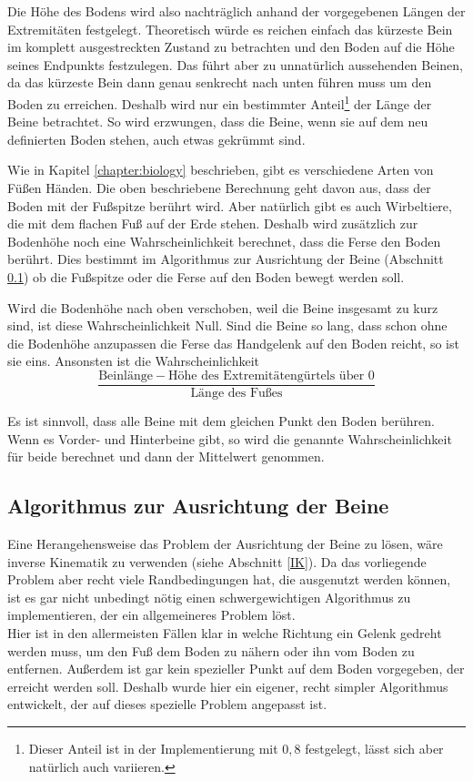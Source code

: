 Die Höhe des Bodens wird also nachträglich anhand der vorgegebenen Längen der Extremitäten festgelegt.
Theoretisch würde es reichen einfach das kürzeste Bein im komplett ausgestreckten Zustand zu betrachten und den Boden auf die Höhe seines Endpunkts festzulegen.
Das führt aber zu unnatürlich aussehenden Beinen, da das kürzeste Bein dann genau senkrecht nach unten führen muss um den Boden zu erreichen.
Deshalb wird nur ein bestimmter Anteil\footnote{Dieser Anteil ist in der Implementierung mit $0{,}8$ festgelegt, lässt sich aber natürlich auch variieren.} der Länge der Beine betrachtet. So wird erzwungen, dass die Beine, wenn sie auf dem neu definierten Boden stehen, auch etwas gekrümmt sind.

Wie in Kapitel \ref{chapter:biology} beschrieben, gibt es verschiedene Arten von Füßen \bzw Händen. Die oben beschriebene Berechnung geht davon aus, dass der Boden mit der Fußspitze berührt wird. Aber natürlich gibt es auch Wirbeltiere, die mit dem flachen Fuß auf der Erde stehen.
Deshalb wird zusätzlich zur Bodenhöhe noch eine Wahrscheinlichkeit berechnet, dass die Ferse den Boden berührt. Dies bestimmt im Algorithmus zur Ausrichtung der Beine (Abschnitt \ref{leg_algo}) ob die Fußspitze oder die Ferse auf den Boden bewegt werden soll.

Wird die Bodenhöhe nach oben verschoben, weil die Beine insgesamt zu kurz sind, ist diese Wahrscheinlichkeit Null.
Sind die Beine so lang, dass schon ohne die Bodenhöhe anzupassen die Ferse \bzw das Handgelenk auf den Boden reicht, so ist sie eins.
Ansonsten ist die Wahrscheinlichkeit 
\[\frac{\text{Beinlänge} - \text{Höhe des Extremitätengürtels über }0}{\text{Länge des Fußes}}\]

Es ist sinnvoll, dass alle Beine mit dem gleichen Punkt den Boden berühren.
Wenn es Vorder- und Hinterbeine gibt, so wird die genannte Wahrscheinlichkeit für beide berechnet und dann der Mittelwert genommen. 


\subsection{Algorithmus zur Ausrichtung der Beine}
\label{leg_algo}

Eine Herangehensweise das Problem der Ausrichtung der Beine zu lösen, wäre inverse Kinematik zu verwenden (siehe Abschnitt \ref{IK}). 
Da das vorliegende Problem aber recht viele Randbedingungen hat, die ausgenutzt werden können, ist es gar nicht unbedingt nötig einen schwergewichtigen Algorithmus zu implementieren, der ein allgemeineres Problem löst.\\
Hier ist \zb in den allermeisten Fällen klar in welche Richtung ein Gelenk gedreht werden muss, um den Fuß dem Boden zu nähern oder ihn vom Boden zu entfernen. Außerdem ist gar kein spezieller Punkt auf dem Boden vorgegeben, der erreicht werden soll.
Deshalb wurde hier ein eigener, recht simpler Algorithmus entwickelt, der auf dieses spezielle Problem angepasst ist.

